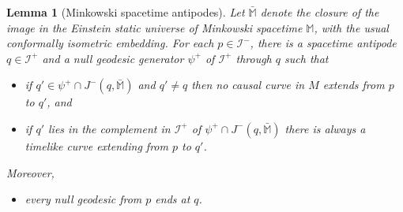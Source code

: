 \documentclass[12pt]{amsart}
\numberwithin{equation}{section}
\newtheorem{lemma}[theorem]{Lemma}
\begin{document}
\begin{lemma}[Minkowski spacetime antipodes]\label{lemma5.1}
Let ${\bar {\mathbb M}}$ denote the closure of the image in the Einstein static universe of Minkowski spacetime ${\mathbb M}$, with the usual conformally isometric embedding. For each $p\in{\mathcal I}^-$, there is a spacetime antipode $q\in{\mathcal I}^+$ and a null geodesic generator $\psi^+$ of ${\mathcal I}^+$ through $q$ such that
\begin{itemize}
\item [(i)] if $q'\in \psi^+\cap J^-(q,{\bar {\mathbb M}})$ and $q'\neq q$ then no causal curve in $M$ extends from $p$ to $q'$, and
\item [(ii)] if $q'$ lies in the complement in ${\mathcal I}^+$ of $\psi^+\cap J^-(q,{\bar {\mathbb M}})$ there is always a timelike curve extending from $p$ to $q'$.
\end{itemize}
Moreover,
\begin{itemize}
\item [(iii)] every null geodesic from $p$ ends at $q$.
\end{itemize}
\end{lemma}
\end{document}
